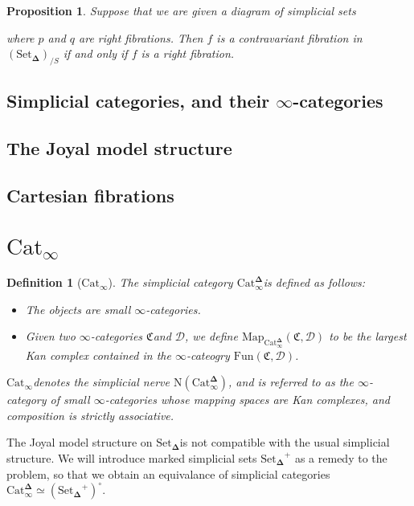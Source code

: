 \documentclass[12pt]{amsart}
\newcommand{\8}{\ensuremath{\infty}}
\newcommand{\C}{\ensuremath{\mathfrak{C}}}
\newcommand{\D}{\ensuremath{\mathscr{D}}}
\newcommand{\SSet}{\ensuremath{\text{Set}_{\boldsymbol{\Delta}}}}
\newcommand{\Catinfdel}{\ensuremath{\text{Cat}^{\boldsymbol{\Delta}}_{\infty}}}
\newcommand{\Catinf}{\ensuremath{\text{Cat}_{\infty}}}
\newcommand{\Map}{\ensuremath{\text{Map}}}
\newcommand{\Fun}{\ensuremath{\text{Fun}}}
\newtheorem{definition}{Definition}
\newtheorem{proposition}{Proposition}
\begin{document}
{{\begin{proposition}
  Suppose that we are given a diagram of simplicial sets 
  where $p$ and $q$ are right fibrations. Then $f$ is a contravariant fibration in $(\SSet)_{/S}$ if and only if $f$ is a right fibration.
\end{proposition}



\subsection{Simplicial categories, and their \texorpdfstring{$\8$-categories}{∞-categories}}
\subsection{The Joyal model structure}
\subsection{Cartesian fibrations}

\section{\texorpdfstring{$\text{Cat}_\8$}{Cat∞}}

\begin{definition}[\Catinf]
  The simplicial category \Catinfdel is defined as follows:
  \begin{itemize}
    \item The objects are small \8-categories.
    \item Given two \8-categories \C and \D, we define $\Map_{\Catinfdel}(\C, \D)$ to be the largest Kan complex contained in the \8-cateogry $\Fun(\C, \D)$.
  \end{itemize}

  \Catinf denotes the simplicial nerve $\text{N}(\Catinfdel)$, and is referred to as the \8-category of small \8-categories whose mapping spaces are Kan complexes, and composition is strictly associative.
\end{definition}

The Joyal model structure on \SSet is not compatible with the usual simplicial structure. We will introduce marked simplicial sets $\SSet^+$ as a remedy to the problem, so that we obtain an equivalance of simplicial categories $\Catinfdel \simeq (\SSet^+)^\circ$.

}}
\end{document}
